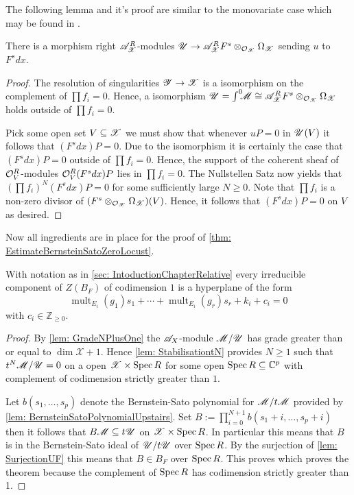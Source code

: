 The following lemma and it's proof are similar to the monovariate case which may be found in \cite[p246]{bjork1979rings}.
\begin{lemma}\label{lem: SurjectionUF}
  There is a morphism right $\mathscr{A}_{\mathscr{X}}^R$-modules $\mathscr{U}\to \mathscr{A}_{\mathscr{X}}^RF^s \otimes_{\mathcal{O}_{\mathscr{X}}}\Omega_{\mathscr{X}}$ sending $u$ to $F^sdx$.
\end{lemma}
\begin{proof}
   The resolution of singularities $\mathscr{Y}\to \mathscr{X}$ is a isomorphism on the complement of $\prod f_i = 0$. Hence, a isomorphism $\mathscr{U} = \int^0 \mkern -8mu \mathscr{M} \cong  \mathscr{A}_{\mathscr{X}}^RF^s  \otimes_{\mathcal{O}_{\mathscr{X}}}\Omega_{\mathscr{X}}$ holds outside of $\prod f_i = 0$.

  Pick some open set $V\subseteq \mathscr{X}$ we must show that whenever $uP = 0$ in $\mathscr{U}(V)$ it follows that $(F^s dx)P = 0$.
  Due to the isomorphism it is certainly the case that $(F^s dx) P = 0$ outside of $\prod f_i = 0$.
  Hence, the support of the coherent sheaf of $\mathcal{O}_V^R$-modules $\mathcal{O}_V^R (F^s dx) P $ lies in $\prod f_i = 0$.
  The Nullstellen Satz now yields that $(\prod f_i)^N (F^s dx) P  = 0$ for some sufficiently large $N\geq 0$.
  Note that $\prod f_i$ is a non-zero divisor of $(F^s\otimes_{\mathcal{O}_{\mathscr{X}}} \Omega_{\mathscr{X}})(V)$. Hence, it follows that $(F^s dx) P= 0$ on $V$ as desired.
\end{proof}
Now all ingredients are in place for the proof of \cref{thm: EstimateBernsteinSatoZeroLocust}.
\begin{theorem}
  With notation as in \cref{sec: IntoductionChapterRelative} every irreducible component of $Z(B_F)$ of codimension $1$ is a hyperplane of the form
  $$\operatorname{mult}_{E_i}(g_1) s_1 + \cdots + \operatorname{mult}_{E_i}(g_r)s_r + k_i + c_i=0$$
  with $c_i \in \mathbb{Z}_{\geq 0 }$.
\end{theorem}
\begin{proof}
  By \cref{lem: GradeNPlusOne} the $\mathscr{A}_X$-module $\mathscr{M}/\mathscr{U}$ has grade greater than or equal to $\dim\mathcal{X} + 1$. Hence \cref{lem: StabilisationtN} provides $N\geq 1$ such that $t^N\mathscr{M}/\mathscr{U} = 0$ on a open $\mathscr{X}\times\operatorname{Spec} R$ for some open $\operatorname{Spec} R\subseteq \mathbb{C}^p$ with complement of codimension strictly greater than $1$.

  Let $b(s_1,\ldots,s_p)$ denote the Bernstein-Sato polynomial for $\mathscr{M}/t\mathscr{M}$ provided by \cref{lem: BernsteinSatoPolynomialUpstairs}.
  Set $B := \prod_{i=0}^{N+1} b(s_1 + i, \ldots, s_p + i)$ then it follows that
  $B\mathscr{M} \subseteq t\mathscr{U}$ on $\mathscr{X} \times \operatorname{Spec} R$.
  In particular this means that $B$ is in the Bernstein-Sato ideal of $\mathscr{U}/t\mathscr{U}$ over $\operatorname{Spec} R$.
  By the surjection of \cref{lem: SurjectionUF} this means that $B\in B_F$ over $\operatorname{Spec} R$. This proves which proves the theorem because the complement of $\operatorname{Spec} R$ has codimension strictly greater than 1.
\end{proof}
